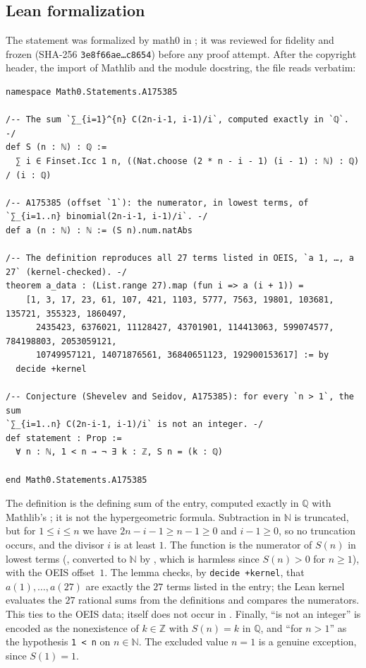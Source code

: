 \documentclass[11pt]{amsart}
\theoremstyle{plain}
\theoremstyle{definition}
\newcommand{\N}{\mathbb{N}}
\newcommand{\Q}{\mathbb{Q}}
\newcommand{\Z}{\mathbb{Z}}
\begin{document}
\subsection*{Lean formalization}
The statement was formalized by math0 in ; it was reviewed for fidelity and frozen (SHA-256 \texttt{3e8f66ae\ldots c8654}) before any proof attempt.
After the copyright header, the import of Mathlib and the module docstring, the file reads verbatim:
\begin{lstlisting}
namespace Math0.Statements.A175385

/-- The sum `∑_{i=1}^{n} C(2n-i-1, i-1)/i`, computed exactly in `ℚ`. -/
def S (n : ℕ) : ℚ :=
  ∑ i ∈ Finset.Icc 1 n, ((Nat.choose (2 * n - i - 1) (i - 1) : ℕ) : ℚ) / (i : ℚ)

/-- A175385 (offset `1`): the numerator, in lowest terms, of
`∑_{i=1..n} binomial(2n-i-1, i-1)/i`. -/
def a (n : ℕ) : ℕ := (S n).num.natAbs

/-- The definition reproduces all 27 terms listed in OEIS, `a 1, …, a 27` (kernel-checked). -/
theorem a_data : (List.range 27).map (fun i => a (i + 1)) =
    [1, 3, 17, 23, 61, 107, 421, 1103, 5777, 7563, 19801, 103681, 135721, 355323, 1860497,
      2435423, 6376021, 11128427, 43701901, 114413063, 599074577, 784198803, 2053059121,
      10749957121, 14071876561, 36840651123, 192900153617] := by
  decide +kernel

/-- Conjecture (Shevelev and Seidov, A175385): for every `n > 1`, the sum
`∑_{i=1..n} C(2n-i-1, i-1)/i` is not an integer. -/
def statement : Prop :=
  ∀ n : ℕ, 1 < n → ¬ ∃ k : ℤ, S n = (k : ℚ)

end Math0.Statements.A175385
\end{lstlisting}
The definition  is the defining sum of the entry, computed exactly in $\Q$ with Mathlib's ; it is not the hypergeometric formula.
Subtraction in $\N$ is truncated, but for $1\le i\le n$ we have $2n-i-1\ge n-1\ge0$ and $i-1\ge0$, so no truncation occurs, and the divisor $i$ is at least $1$.
The function  is the numerator of $S(n)$ in lowest terms (, converted to $\N$ by , which is harmless since $S(n)>0$ for $n\ge1$), with the OEIS offset~$1$.
The lemma  checks, by \texttt{decide +kernel}, that $a(1),\dots,a(27)$ are exactly the $27$ terms listed in the entry; the Lean kernel evaluates the $27$ rational sums from the definitions and compares the numerators.
This ties  to the OEIS data;  itself does not occur in .
Finally, ``is not an integer'' is encoded as the nonexistence of $k\in\Z$ with $S(n)=k$ in $\Q$, and ``for $n>1$'' as the hypothesis \texttt{1 < n} on $n\in\N$.
The excluded value $n=1$ is a genuine exception, since $S(1)=1$.
\end{document}
